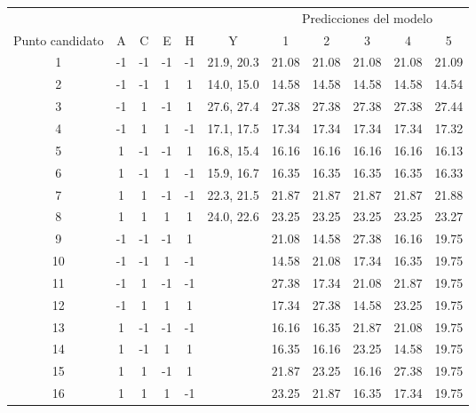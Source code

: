 \begin{center}
	\begin{tabular}{c|ccccc|ccccc}
		\multicolumn{6}{c|}{} & \multicolumn{5}{c}{Predicciones del modelo} \\
		\multicolumn{1}{V}{Punto candidato} & A & C & E & H & Y & 1 & 2 & 3 & 4 & 5 \\
		\hline
		1 & -1 & -1 & -1 & -1 & 21.9, 20.3 & 21.08 & 21.08 & 21.08 & 21.08 & 21.09 \\
		
		2 & -1 & -1 & 1 & 1 & 14.0, 15.0 & 14.58 & 14.58 & 14.58 & 14.58 & 14.54 \\
		
		3 & -1 & 1 & -1 & 1 & 27.6, 27.4 & 27.38 & 27.38 & 27.38 & 27.38 & 27.44 \\
		
		4 & -1 & 1 & 1 & -1 & 17.1, 17.5 & 17.34 & 17.34 & 17.34 & 17.34 & 17.32 \\
		
		5 & 1 & -1 & -1 & 1 & 16.8, 15.4 & 16.16 & 16.16 & 16.16 & 16.16 & 16.13 \\
		
		6 & 1 & -1 & 1 & -1 & 15.9, 16.7 & 16.35 & 16.35 & 16.35 & 16.35 & 16.33  \\
		
		7 & 1 & 1 & -1 & -1 & 22.3, 21.5 & 21.87 & 21.87 & 21.87 & 21.87 & 21.88 \\
		
		8 & 1 & 1 & 1 & 1 & 24.0, 22.6 & 23.25 & 23.25 & 23.25 & 23.25 & 23.27 \\
		
		 9 & -1 & -1 & -1 & 1 &  & 21.08 & 14.58 & 27.38 & 16.16 & 19.75 \\
		
		 10 & -1 & -1 & 1 & -1 &  & 14.58 & 21.08 & 17.34 & 16.35 & 19.75 \\
		
		 11 & -1 & 1 & -1 & -1 &   & 27.38 & 17.34 & 21.08 & 21.87 & 19.75 \\
		
		 12 & -1 & 1 & 1 & 1 &   & 17.34 & 27.38 & 14.58 & 23.25 & 19.75 \\
		
		 13 & 1 & -1 & -1 & -1 &   & 16.16 & 16.35 & 21.87 & 21.08 & 19.75 \\
		
		 14 & 1 & -1 & 1 & 1 &   & 16.35 & 16.16 & 23.25 & 14.58 & 19.75 \\
		
		 15 & 1 & 1 & -1 & 1 &   & 21.87 & 23.25 & 16.16 & 27.38 & 19.75 \\
		
		 16 & 1 & 1 & 1 & -1 &    & 23.25 & 21.87 & 16.35 & 17.34 & 19.75 \\
		
	\end{tabular}
	 \label{extra_runs_ej1}
\end{center}

